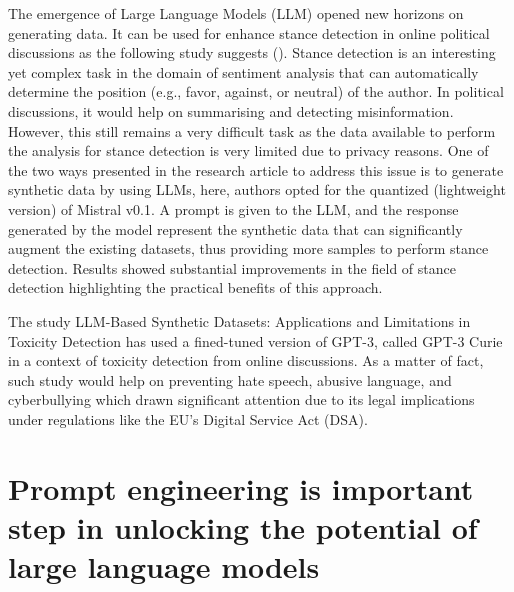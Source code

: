 The emergence of Large Language Models (LLM) opened new horizons on generating data. It can be used for enhance stance detection in online political discussions as the following study suggests (). Stance detection is an interesting yet complex task in the domain of sentiment analysis that can automatically determine the position (e.g., favor, against, or neutral) of the author. In political discussions, it would help on summarising and detecting misinformation. However, this still remains a very difficult task as the data available to perform the analysis for stance detection is very limited due to privacy reasons. One of the two ways presented in the research article to address this issue is to generate synthetic data by using LLMs, here, authors opted for the quantized (lightweight version) of Mistral v0.1. A prompt is given to the LLM, and the response generated by the model represent the synthetic data that can significantly augment the existing datasets, thus providing more samples to perform stance detection. Results showed substantial improvements in the field of stance detection highlighting the practical benefits of this approach.


The study LLM-Based Synthetic Datasets: Applications and Limitations in Toxicity Detection has used a fined-tuned version of GPT-3, called GPT-3 Curie in a context of toxicity detection from online discussions. 
As a matter of fact, such study would help on preventing hate speech, abusive language, and cyberbullying which drawn significant attention due to its legal implications under regulations like the EU's Digital Service Act (DSA). 
























\section{Prompt engineering is important step in unlocking the potential of large language models}



